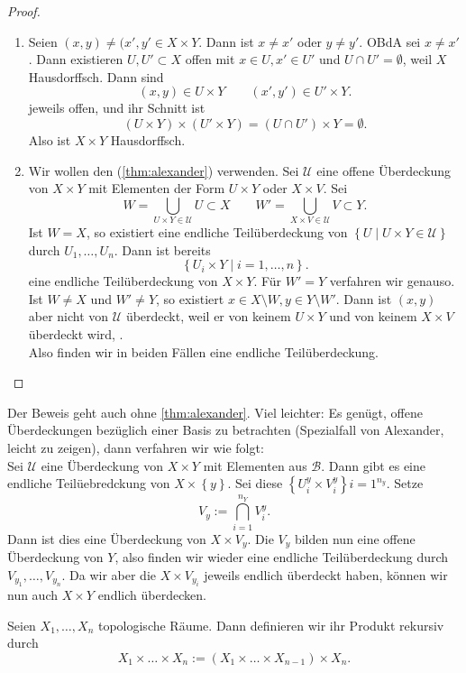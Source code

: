 \begin{proof}
    \begin{enumerate}[1)]
        \item Seien $(x,y) \neq  (x',y' \in X\times Y$. Dann ist $x\neq x'$ oder $y\neq y'$. OBdA sei $x\neq x'$. Dann existieren $U,U'\subset X$ offen mit $x\in U, x'\in U'$ und $U\cap U' = \emptyset$, weil $X$ Hausdorffsch. Dann sind
            \[
                (x,y)           \in  U\times Y \qquad (x',y') \in U' \times Y
            .\] 
    jeweils offen, und ihr Schnitt ist
    \[
        (        U\times Y) \times (U'\times Y) = (U\cap U') \times Y = \emptyset
    .\] 
    Also ist $X\times Y$ Hausdorffsch.
\item Wir wollen den  (\ref{thm:alexander}) verwenden. Sei $\mathcal{U}$ eine offene Überdeckung von  $X\times Y$ mit Elementen der Form $U\times Y$ oder $X\times V$. Sei
    \[
    W = \bigcup_{U\times Y \in \mathcal{U}} U \subset X \qquad W' = \bigcup_{X\times V \in \mathcal{U}} V \subset Y  
    .\] 
    Ist $W = X$, so existiert eine endliche Teilüberdeckung von  $\left \{U \mid  U\times Y \in \mathcal{U}\right\} $ durch $U_1,\ldots,U_n$. Dann ist bereits
    \[
    \left \{U_i \times Y \mid  i=1,\ldots,n\right\} 
    .\] 
    eine endliche Teilüberdeckung von $X\times Y$. Für $W' = Y$ verfahren wir genauso. Ist  $W \neq  X$ und $W'\neq Y$, so existiert $x\in X \setminus W, y\in Y \setminus W'$. Dann ist $(x,y)$ aber nicht von  $\mathcal{U}$ überdeckt, weil er von keinem $U\times Y$ und von keinem $X\times V$ überdeckt wird, \contra. \\
    Also finden wir in beiden Fällen eine endliche Teilüberdeckung.
    \end{enumerate}
\end{proof}
\begin{remark}
    Der Beweis geht auch ohne \autoref{thm:alexander}. Viel leichter: Es genügt, offene Überdeckungen bezüglich einer Basis zu betrachten (Spezialfall von Alexander, leicht zu zeigen), dann verfahren wir wie folgt: \\
    Sei $\mathcal{U}$ eine Überdeckung von $X\times Y$ mit Elementen aus $\mathcal{B}$. Dann gibt es eine endliche Teilüebredckung von $X\times \left \{y\right\} $. Sei diese $\left \{U_i^y \times V_i^y\right\} i=1^{n_y}$. Setze
    \[
        V_y := \bigcap_{i=1} ^{n_Y} V_i^{y}
    .\] 
    Dann ist dies eine Überdeckung von $X\times V_y$. Die $V_y$ bilden nun eine offene Überdeckung von  $Y$, also finden wir wieder eine endliche Teilüberdeckung durch  $V_{y_1}, \ldots, V_{y_n}$. Da wir aber die $X\times V_{y_i}$ jeweils endlich überdeckt haben, können wir nun auch $X\times Y$ endlich überdecken.
\end{remark}
\begin{definition}
Seien $X_1,\ldots,X_n$ topologische Räume. Dann definieren wir ihr Produkt rekursiv durch
\[
    X_1\times \ldots\times X_n := (X_1\times \ldots\times X_{n-1})\times X_n
.\] 
\end{definition}

